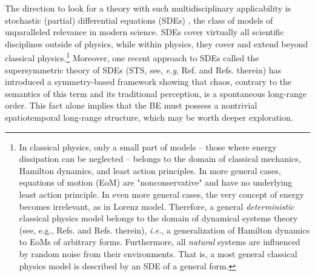 \documentclass[final,5p,10pt,times,twocolumn,year]{elsarticle}
\begin{document}

The direction to look for a theory with such multidisciplinary applicability is stochastic (partial) differential equations (SDEs) \cite{Oks10,Baxendale1,Watanabe1,Crauel1,Baxendale.10.1007/BFb0076851,Arnold.10.1007/BFb0076835, ARNOLD19831,Oks10,LEJAN1984307,Kunita2019,Hairer_2001,kupiainen2016renormalization,Heirer_2018,Bedrossian_RecentReview}, the class of models of unparalleled relevance in modern science. SDEs cover virtually all scientific disciplines outside of physics, while within physics, they cover and extend beyond classical physics.\footnote{In classical physics, only a small part of models -- those where energy dissipation can be neglected -- belongs to the domain of classical mechanics, Hamilton dynamics, and least action principles. In more general cases, equations of motion (EoM) are "nonconservative" and have no underlying least action principle. In even more general cases, the very concept of energy becomes irrelevant, as in Lorenz model. \cite{Lorenz} Therefore, a general \emph{deterministic} classical physics model belongs to the domain of dynamical systems theory (see, e.g., Refs.\cite{Arn03,Gil98,Teschl,Izhikevich,Chaos_book_1,Chaos_book_2} and Refs. therein), \emph{i.e.}, a generalization of Hamilton dynamics to EoMs of arbitrary forms. Furthermore, all \emph{natural} systems are influenced by random noise from their environments. That is, a most general classical physics model is described by an SDE of a general form.} 
Moreover, one recent approach to SDEs called the supersymmetric theory of SDEs (STS, see, \emph{e.g}, Ref.\cite{OVCHINNIKOV2024114611} and Refs. therein) has introduced a symmetry-based framework showing that chaos, contrary to the semantics of this term and its traditional perception, is a spontaneous long-range order. This fact alone implies that the BE must possess a nontrivial spatiotemporal long-range structure, which may be worth deeper exploration.
\end{document}
